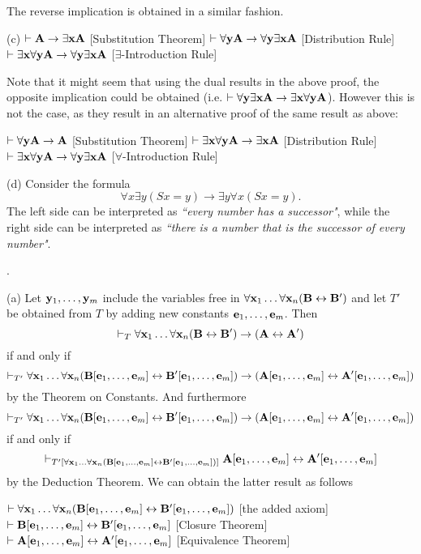 The reverse implication is obtained in a similar fashion.
\smallskip

\ansitem (c)
\itemitem{} $\vdash {\bf A} \to \exists{\bf x}{\bf A}$ \hfill [Substitution Theorem]
\itemitem{} $\vdash \forall{\bf y}{\bf A} \to \forall{\bf y}\exists{\bf x}{\bf A}$ \hfill [Distribution Rule]
\itemitem{} $\vdash \exists{\bf x}\forall{\bf y}{\bf A} \to \forall{\bf y}\exists{\bf x}{\bf A}$ \hfill [$\exists$-Introduction Rule]

Note that it might seem that using the dual results in the above proof, the opposite implication could be
obtained (i.e. $\vdash \forall{\bf y}\exists{\bf x}{\bf A} \to \exists{\bf x}\forall{\bf y}{\bf A}$). However this is not the case, as
they result in an alternative proof of the same result as above:

\itemitem{} $\vdash \forall{\bf y}{\bf A} \to {\bf A}$ \hfill [Substitution Theorem]
\itemitem{} $\vdash \exists{\bf x}\forall{\bf y}{\bf A} \to \exists{\bf x}{\bf A}$ \hfill [Distribution Rule]
\itemitem{} $\vdash \exists{\bf x}\forall{\bf y}{\bf A} \to \forall{\bf y}\exists{\bf x}{\bf A}$ \hfill [$\forall$-Introduction Rule]
\smallskip

\ansitem (d) Consider the formula
$$\forall x \exists y (Sx = y) \to \exists y \forall x (Sx = y).$$
The left side can be interpreted as {\it ``every number has a successor"}, while the
right side can be interpreted as {\it ``there is a number that is the successor of every number"}.

\medskip

. 

\ansitem (a) Let ${\bf y}_1, \dots, {\bf y}_m$ include the variables free in $\forall{\bf x}_1 \dots \forall{\bf x}_n ({\bf B} \leftrightarrow {\bf B}')$ 
and let $T'$ be obtained from $T$ by adding new constants ${\bf e}_1, \dots, {\bf e}_m$. Then 
$$
\vdash_T \forall{\bf x}_1 \dots \forall{\bf x}_n ({\bf B} \leftrightarrow {\bf B}') \to ({\bf A} \leftrightarrow {\bf A}')
$$
if and only if 
$$
\vdash_{T'} \forall{\bf x}_1 \dots \forall{\bf x}_n ({\bf B}[{\bf e}_1, \dots, {\bf e}_m] \leftrightarrow {\bf B}'[{\bf e}_1, \dots, {\bf e}_m]) \to ({\bf A}[{\bf e}_1, \dots, {\bf e}_m] \leftrightarrow {\bf A}'[{\bf e}_1, \dots, {\bf e}_m])
$$
by the Theorem on Constants. And furthermore
$$
\vdash_{T'} \forall{\bf x}_1 \dots \forall{\bf x}_n ({\bf B}[{\bf e}_1, \dots, {\bf e}_m] \leftrightarrow {\bf B}'[{\bf e}_1, \dots, {\bf e}_m]) \to ({\bf A}[{\bf e}_1, \dots, {\bf e}_m] \leftrightarrow {\bf A}'[{\bf e}_1, \dots, {\bf e}_m])
$$
if and only if
$$
\vdash_{T'[\forall{\bf x}_1 \dots \forall{\bf x}_n ({\bf B}[{\bf e}_1, \dots, {\bf e}_m] \leftrightarrow {\bf B}'[{\bf e}_1, \dots, {\bf e}_m])]} {\bf A}[{\bf e}_1, \dots, {\bf e}_m] \leftrightarrow {\bf A}'[{\bf e}_1, \dots, {\bf e}_m]
$$
by the Deduction Theorem. We can obtain the latter result as follows

\itemitem{} $\vdash \forall{\bf x}_1 \dots \forall{\bf x}_n ({\bf B}[{\bf e}_1, \dots, {\bf e}_m] \leftrightarrow {\bf B}'[{\bf e}_1, \dots, {\bf e}_m])$ \hfill [the added axiom]
\itemitem{} $\vdash {\bf B}[{\bf e}_1, \dots, {\bf e}_m] \leftrightarrow {\bf B}'[{\bf e}_1, \dots, {\bf e}_m]$ \hfill [Closure Theorem]
\itemitem{} $\vdash {\bf A}[{\bf e}_1, \dots, {\bf e}_m] \leftrightarrow {\bf A}'[{\bf e}_1, \dots, {\bf e}_m]$ \hfill [Equivalence Theorem]

